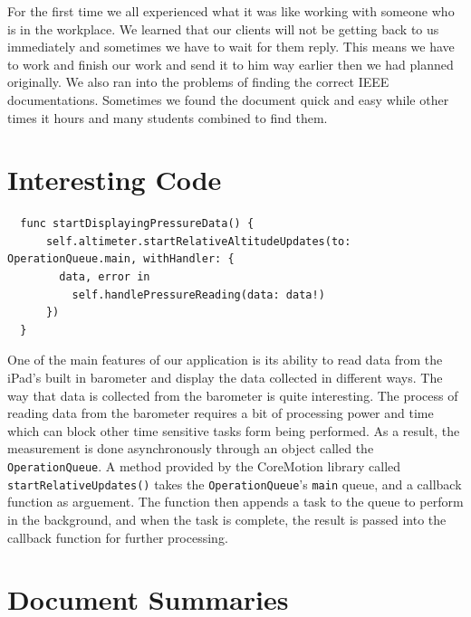 \documentclass[onecolumn, draftclsnofoot,10pt, compsoc]{IEEEtran}
\begin{document}
For the first time we all experienced what it was like working with someone who is in the workplace.
We learned that our clients will not be getting back to us immediately and sometimes we have to wait for them reply.
This means we have to work and finish our work and send it to him way earlier then we had planned originally.
We also ran into the problems of finding the correct IEEE documentations.
Sometimes we found the document quick and easy while other times it hours and many students combined to find them.

\section{Interesting Code}
\begin{lstlisting}
  func startDisplayingPressureData() {
      self.altimeter.startRelativeAltitudeUpdates(to: OperationQueue.main, withHandler: {
        data, error in
          self.handlePressureReading(data: data!)
      })
  }

\end{lstlisting}

One of the main features of our application is its ability to read data from the iPad's built in barometer and display the data collected in different ways.
The way that data is collected from the barometer is quite interesting.
The process of reading data from the barometer requires a bit of processing power and time which can block other time sensitive tasks form being performed.
As a result, the measurement is done asynchronously through an object called the \texttt{OperationQueue}.
A method provided by the CoreMotion library called \texttt{startRelativeUpdates()} takes the \texttt{OperationQueue}'s \texttt{main} queue, and a callback function as arguement.
The function then appends a task to the queue to perform in the background, and when the task is complete, the result is passed into the callback function for further processing.\\

\section{Document Summaries}
\end{document}
